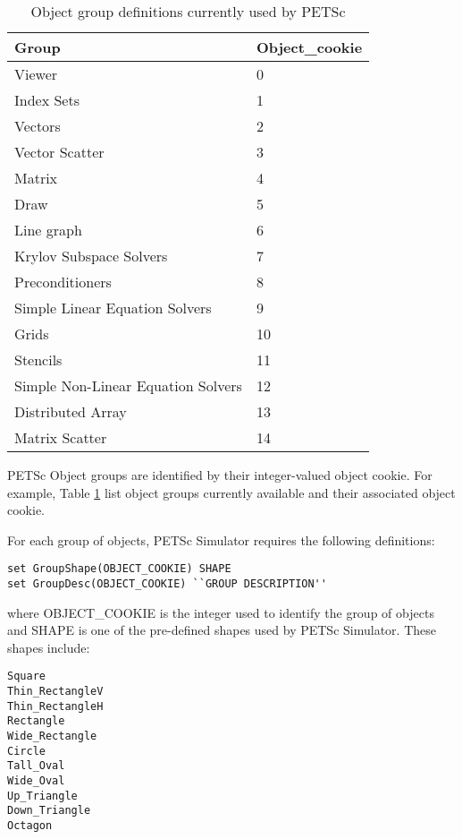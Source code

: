 \begin{table}
\begin{tabular}{||l||l||} \hline
Group                              & Object\_cookie \\ \hline
Viewer                             &  0 \\ \hline
Index Sets                         &  1 \\ \hline
Vectors                            &  2 \\ \hline
Vector Scatter                     &  3 \\ \hline
Matrix                             &  4 \\ \hline
Draw                               &  5 \\ \hline
Line graph                         &  6 \\ \hline
Krylov Subspace Solvers            &  7 \\ \hline
Preconditioners                    &  8 \\ \hline
Simple Linear Equation Solvers     &  9 \\ \hline
Grids                              & 10 \\ \hline
Stencils                           & 11 \\ \hline
Simple Non-Linear Equation Solvers & 12 \\ \hline
Distributed Array                  & 13 \\ \hline
Matrix Scatter                     & 14 \\ \hline
\end{tabular}
\caption{Object group definitions currently used by PETSc}
\label{PETSc object definitions}
\end{table}

PETSc Object groups are identified by their integer-valued object cookie.  For example, Table \ref{PETSc object definitions} list object groups currently available and their associated object cookie.

For each group of objects, PETSc Simulator requires the following definitions:
\begin{verbatim}
set GroupShape(OBJECT_COOKIE) SHAPE 
set GroupDesc(OBJECT_COOKIE) ``GROUP DESCRIPTION''
\end{verbatim}
where OBJECT\_COOKIE is the integer used to identify the group of objects and SHAPE is one of the pre-defined shapes used by PETSc Simulator.  These shapes include:
\begin{verbatim}
Square
Thin_RectangleV
Thin_RectangleH
Rectangle
Wide_Rectangle
Circle
Tall_Oval
Wide_Oval
Up_Triangle
Down_Triangle
Octagon
\end{verbatim}

